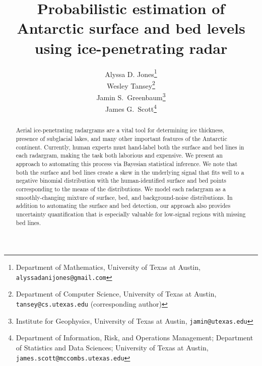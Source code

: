 \documentclass[11pt,]{article} %
\title{Probabilistic estimation of Antarctic surface and bed levels using ice-penetrating radar}
\author{
Alyssa D. Jones\footnote{Department of Mathematics, University of Texas at Austin, \texttt{alyssadanijones@gmail.com}} \\
Wesley Tansey\footnote{Department of Computer Science, University of Texas at Austin, \texttt{tansey@cs.utexas.edu} (corresponding author)} \\
Jamin S.~Greenbaum\footnote{Institute for Geophysics, University of Texas at Austin, \texttt{jamin@utexas.edu}} \\
James G.~Scott\footnote{Department of Information, Risk, and Operations Management; Department of Statistics and Data Sciences; University of Texas at Austin, \texttt{james.scott@mccombs.utexas.edu}}
}
\begin{document}
\maketitle

\begin{abstract}
Aerial ice-penetrating radargrams are a vital tool for determining ice thickness, presence of subglacial lakes, and many other important features of the Antarctic continent. Currently, human experts must hand-label both the surface and bed lines in each radargram, making the task both laborious and expensive. We present an approach to automating this process via Bayesian statistical inference. We note that both the surface and bed lines create a skew in the underlying signal that fits well to a negative binomial distribution with the human-identified surface and bed points corresponding to the means of the distributions. We model each radargram as a smoothly-changing mixture of surface, bed, and background-noise distributions. In addition to automating the surface and bed detection, our approach also provides uncertainty quantification that is especially valuable for low-signal regions with missing bed lines.
\end{abstract}

\begin{spacing}{1.7}




\end{spacing}

\begin{small}


\end{small}
\end{document}
